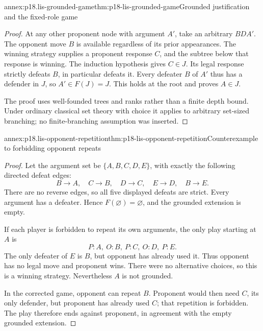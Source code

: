 \begin{annexitem}{annex:p18.lis-grounded-game}{thm:p18-lis-grounded-game}{Grounded justification and the fixed-role game}
\begin{proof}
At any other proponent node with argument \(A'\), take an arbitrary
\(BDA'\). The opponent move \(B\) is available regardless of its
prior appearances. The winning strategy supplies a proponent
response \(C\), and the subtree below that response is winning.
The induction hypothesis gives \(C\in J\).
Its legal response strictly defeats \(B\), in particular defeats it.
Every defeater \(B\) of \(A'\) thus has a defender in \(J\),
so \(A'\in F(J)=J\).
This holds at the root and proves \(A\in J\).

The proof uses well-founded trees and ranks rather than a finite
depth bound. Under ordinary classical set theory with choice it
applies to arbitrary set-sized branching; no finite-branching
assumption was inserted.
\end{proof}
\end{annexitem}

\begin{annexitem}{annex:p18.lis-opponent-repetition}{thm:p18-lis-opponent-repetition}{Counterexample to forbidding opponent repeats}
\begin{proof}
Let the argument set be \(\{A,B,C,D,E\}\), with exactly the
following directed defeat edges:
\[
B\longrightarrow A,\quad C\longrightarrow B,\quad
D\longrightarrow C,\quad E\longrightarrow D,\quad
B\longrightarrow E .
\]
There are no reverse edges, so all five displayed defeats are strict.
Every argument has a defeater. Hence \(F(\varnothing)=\varnothing\),
and the grounded extension is empty.

If each player is forbidden to repeat its own arguments, the only
play starting at \(A\) is
\[
P:A,\ O:B,\ P:C,\ O:D,\ P:E .
\]
The only defeater of \(E\) is \(B\), but opponent has already used it.
Thus opponent has no legal move and proponent wins.
There were no alternative choices, so this is a winning strategy.
Nevertheless \(A\) is not grounded.

In the corrected game, opponent can repeat \(B\).
Proponent would then need \(C\), its only defender, but proponent
has already used \(C\); that repetition is forbidden.
The play therefore ends against proponent, in agreement with the
empty grounded extension.
\end{proof}
\end{annexitem}

